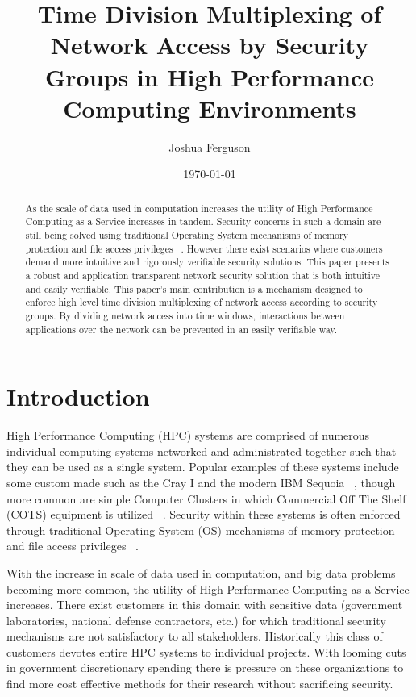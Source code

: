 \documentclass{article}
\begin{document}
\title{Time Division Multiplexing of Network Access by Security Groups in High Performance Computing Environments}
\author{Joshua Ferguson}
\date{\today}
\maketitle
\begin{abstract}
As the scale of data used in computation increases the utility of High Performance Computing as a Service increases in tandem. Security concerns in such a domain are still being solved using traditional Operating System mechanisms of memory protection and file access privileges ~\cite{buyya1999high}. However there exist scenarios where customers demand more intuitive and rigorously verifiable security solutions. This paper presents a robust and application transparent network security solution that is both intuitive and easily verifiable. This paper's main contribution is a mechanism designed to enforce high level time division multiplexing of network access according to security groups. By dividing network access into time windows, interactions between applications over the network can be prevented in an easily verifiable way. 
\end{abstract}
\section{Introduction}
High Performance Computing (HPC) systems are comprised of numerous individual computing systems networked and administrated together such that they can be used as a single system. Popular examples of these systems include some custom made such as the Cray I and the modern IBM Sequoia ~\cite{leavitt2012big}, though more common are simple Computer Clusters in which Commercial Off The Shelf (COTS) equipment is utilized ~\cite{buyya1999high}. Security within these systems is often enforced through traditional Operating System (OS) mechanisms of memory protection and file access privileges ~\cite{buyya1999high}. 

With the increase in scale of data used in computation, and big data problems becoming more common, the utility of High Performance Computing as a Service increases. There exist customers in this domain with sensitive data (government laboratories, national defense contractors, etc.) for which traditional security mechanisms are not satisfactory to all stakeholders. Historically this class of customers devotes entire HPC systems to individual projects. With looming cuts in government discretionary spending there is pressure on these organizations to find more cost effective methods for their research without sacrificing security. 
\end{document}
